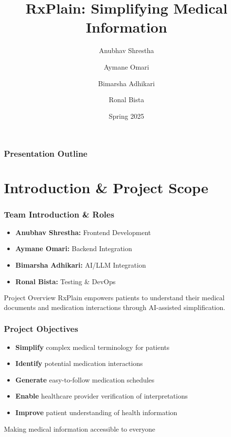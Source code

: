 \documentclass{beamer}
\title[RxPlain]{RxPlain: Simplifying Medical Information}
\author[Team]{Anubhav Shrestha \and Aymane Omari \and Bimarsha Adhikari \and Ronal Bista}
\institute[CS-UH 2012]{CS-UH 2012 Software Engineering}
\date{Spring 2025}
\begin{document}
\begin{frame}
  \titlepage
\end{frame}

\begin{frame}
  \frametitle{Presentation Outline}
  \tableofcontents
\end{frame}

\section{Introduction \& Project Scope}
\begin{frame}
  \frametitle{Team Introduction \& Roles}
  
  \begin{itemize}
    \item \textbf{Anubhav Shrestha:} Frontend Development
    \item \textbf{Aymane Omari:} Backend Integration
    \item \textbf{Bimarsha Adhikari:} AI/LLM Integration
    \item \textbf{Ronal Bista:} Testing \& DevOps
  \end{itemize}
  
  \vspace{0.5cm}
  \begin{alertblock}{Project Overview}
    RxPlain empowers patients to understand their medical documents and medication interactions through AI-assisted simplification.
  \end{alertblock}
\end{frame}

\begin{frame}
  \frametitle{Project Objectives}
  
  \begin{itemize}
    \item \textbf{Simplify} complex medical terminology for patients
    \item \textbf{Identify} potential medication interactions
    \item \textbf{Generate} easy-to-follow medication schedules
    \item \textbf{Enable} healthcare provider verification of interpretations
    \item \textbf{Improve} patient understanding of health information
  \end{itemize}
  
  \vspace{0.5cm}
  \begin{center}
    \large{\textcolor{rxgreen}{Making medical information accessible to everyone}}
  \end{center}
\end{frame}
\end{document}
